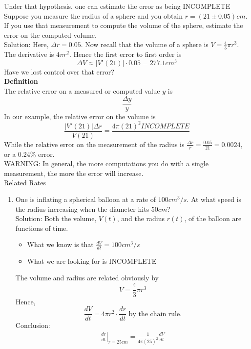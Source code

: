 \documentclass[]{article}
\begin{document}
	Under that hypothesis, one can estimate the error as being INCOMPLETE\\
	Suppose you measure the radius of a sphere and you obtain $r=(21\pm 0.05)cm$. If you use that measurement to compute the volume of the sphere, estimate the error on the computed volume.\\
	Solution: Here, $\Delta r=0.05$. Now recall that the volume of a sphere is $V=\frac{4}{3}\pi r^3$.\\
	The derivative is $4\pi r^2$. Hence the first error to first order is
	$$
		\Delta V\approx|V'(21)|\cdot 0.05=277.1cm^3
	$$
	Have we lost control over that error?\\
	{\bf Definition}\\
	The relative error on a measured or computed value $y$ is
	$$
		\frac{\Delta y}{y}
	$$
	In our example, the relative error on the volume is
	$$
		\frac{|V'(21)|\Delta r}{V(21)}=\frac{4\pi(21)^2 INCOMPLETE}{}
	$$
	While the relative error on the measurement of the radius is $\frac{\Delta r}{r}=\frac{0.05}{21}=0.0024$, or a 0.24\% error.\\
	WARNING: In general, the more computations you do with a single measurement, the more the error will increase.\\
	\large{Related Rates}\\
	\begin{enumerate}
		\item One is inflating a spherical balloon at a rate of $100cm^3/s$. At what speed is the radius increasing when the diameter hits $50cm$?\\
		Solution: Both the volume, $V(t)$, and the radius $r(t)$, of the balloon are functions of time.
		\begin{itemize}
			\item What we know is that $\frac{dV}{dt}=100cm^3/s$
			\item What we are looking for is INCOMPLETE
		\end{itemize}
		The volume and radius are related obviously by
		$$
			V=\frac{4}{3}\pi r^3
		$$
		Hence,
		$$
			\frac{dV}{dt}=4\pi r^2\cdot\frac{dr}{dt}\text{ by the chain rule.}
		$$
		Conclusion:
		\begin{align*}
			\left.\frac{dr}{dt}\right|_{r=25cm}=\frac{1}{4\pi(25)^2}\frac{dV}{dt}\\
		\end{align*}
	\end{enumerate}
\end{document}
